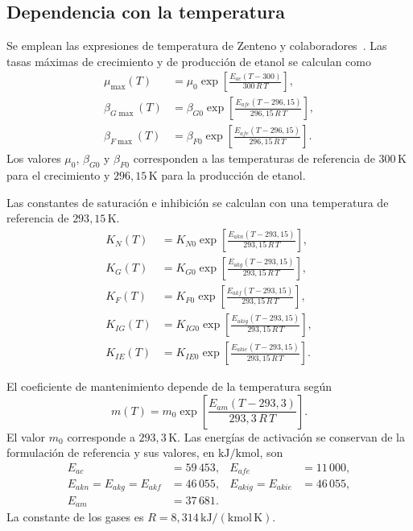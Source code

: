 \subsection{Dependencia con la temperatura}

Se emplean las expresiones de temperatura de Zenteno y
colaboradores~\cite{zenteno2010}. Las tasas m\'aximas de
crecimiento y de producci\'on de etanol se calculan como
\begin{align}
  \mu_{\max}(T) &=
    \mu_0\exp\!\left[\frac{E_{ac}(T-300)}{300\,R\,T}\right],
    \label{eq:c4-temperatura-mu}\\[4pt]
  \beta_{G\max}(T) &=
    \beta_{G0}\exp\!\left[
      \frac{E_{afe}(T-296{,}15)}{296{,}15\,R\,T}\right],
    \label{eq:c4-temperatura-beta-g}\\[4pt]
  \beta_{F\max}(T) &=
    \beta_{F0}\exp\!\left[
      \frac{E_{afe}(T-296{,}15)}{296{,}15\,R\,T}\right].
    \label{eq:c4-temperatura-beta-f}
\end{align}
Los valores \(\mu_0\), \(\beta_{G0}\) y \(\beta_{F0}\)
corresponden a las temperaturas de referencia de \(300\,\mathrm{K}\)
para el crecimiento y \(296{,}15\,\mathrm{K}\) para la
producci\'on de etanol.

Las constantes de saturaci\'on e inhibici\'on se calculan con
una temperatura de referencia de \(293{,}15\,\mathrm{K}\).
\begin{align}
  K_N(T) &= K_{N0}\exp\!\left[
    \frac{E_{akn}(T-293{,}15)}{293{,}15\,R\,T}\right],
    \label{eq:c4-temperatura-kn}\\[4pt]
  K_G(T) &= K_{G0}\exp\!\left[
    \frac{E_{akg}(T-293{,}15)}{293{,}15\,R\,T}\right],
    \label{eq:c4-temperatura-kg}\\[4pt]
  K_F(T) &= K_{F0}\exp\!\left[
    \frac{E_{akf}(T-293{,}15)}{293{,}15\,R\,T}\right],
    \label{eq:c4-temperatura-kf}\\[4pt]
  K_{IG}(T) &= K_{IG0}\exp\!\left[
    \frac{E_{akig}(T-293{,}15)}{293{,}15\,R\,T}\right],
    \label{eq:c4-temperatura-kig}\\[4pt]
  K_{IE}(T) &= K_{IE0}\exp\!\left[
    \frac{E_{akie}(T-293{,}15)}{293{,}15\,R\,T}\right].
    \label{eq:c4-temperatura-kie}
\end{align}

El coeficiente de mantenimiento depende de la temperatura
seg\'un
\begin{equation}
  m(T)=m_0\exp\!\left[
    \frac{E_{am}(T-293{,}3)}{293{,}3\,R\,T}\right].
  \label{eq:c4-temperatura-mantenimiento}
\end{equation}
El valor \(m_0\) corresponde a \(293{,}3\,\mathrm{K}\).
Las energ\'ias de activaci\'on se conservan de la formulaci\'on
de referencia y sus valores, en \(\mathrm{kJ/kmol}\), son
\begin{equation}
  \begin{aligned}
    E_{ac} &= 59\,453, & E_{afe} &= 11\,000,\\
    E_{akn}=E_{akg}=E_{akf} &= 46\,055, &
    E_{akig}=E_{akie} &= 46\,055,\\
    E_{am} &= 37\,681 .
  \end{aligned}
  \label{eq:c4-energias-activacion}
\end{equation}
La constante de los gases es
\(R=8{,}314\,\mathrm{kJ/(kmol\,K)}\).


